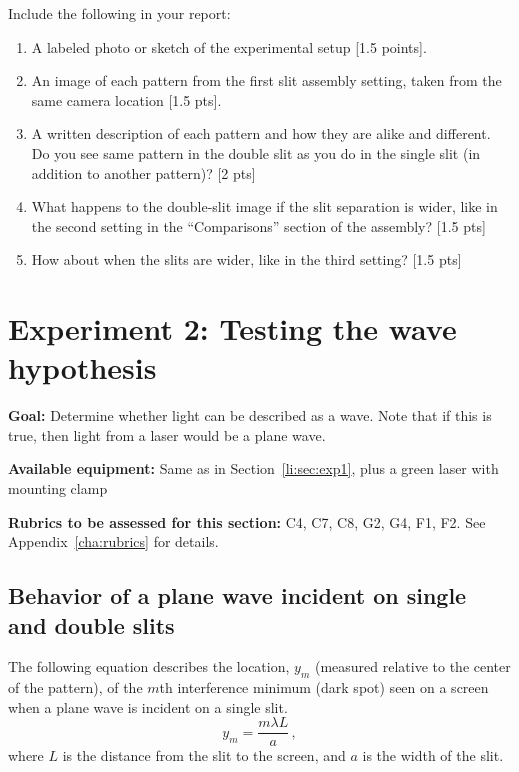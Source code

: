 Include the following in your report:
\begin{enumerate}
	\item A labeled photo or sketch of the experimental setup [1.5 points].
	
	\item An image of each pattern from the first slit assembly setting, taken from the same camera location [1.5 pts].
	
	\item A written description of each pattern and how they are alike and different. Do you see same pattern in the double slit as you do in the single slit (in addition to another pattern)? [2 pts]
	
	\item What happens to the double-slit image if the slit separation is wider, like in the second setting in the ``Comparisons'' section of the assembly? [1.5 pts]
	
	\item How about when the slits are wider, like in the third setting? [1.5 pts]
\end{enumerate}

\section{Experiment 2: Testing the wave hypothesis}

\textbf{Goal:} Determine whether light can be described as a wave. Note that if this is true, then light from a laser would be a plane wave.



\textbf{Available equipment:} Same as in Section~\ref{li:sec:exp1}, plus a green laser with mounting clamp

\textbf{Rubrics to be assessed for this section:} C4, C7, C8, G2, G4, F1, F2. See Appendix~\ref{cha:rubrics} for details.

\subsection{Behavior of a plane wave incident on single and double slits}

The following equation describes the location, $y_m$ (measured relative to the center of the pattern), of the $m$th interference minimum (dark spot) seen on a screen when a plane wave is incident on a single slit.
\begin{equation}
y_m = \frac{m \lambda L}{a} \,,
\end{equation}
where $L$ is the distance from the slit to the screen, and $a$ is the width of the slit.

